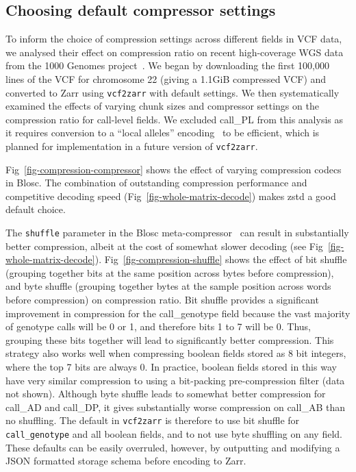 \documentclass[a4paper,num-refs]{oup-contemporary}
\begin{document}
\subsection{Choosing default compressor settings}
To inform the choice of compression settings across different fields 
in VCF data, we analysed their effect on compression ratio on 
recent high-coverage WGS data from the 1000 Genomes 
project~\citep{byrska2022high}. We began by downloading 
the first 100,000 lines of the VCF 
for chromosome 22 (giving a 1.1GiB compressed VCF)
and converted to Zarr using 
\texttt{vcf2zarr} with default settings. We then systematically 
examined the effects of varying chunk sizes and compressor settings
on the compression ratio for call-level fields. We excluded call\_PL
from this analysis as it requires conversion to a ``local alleles''
encoding~\citep{poterba2024scalable} to be efficient, 
which is planned for implementation in a future 
version of \texttt{vcf2zarr}.

Fig~\ref{fig-compression-compressor} shows the effect of varying compression
codecs in Blosc. The combination of outstanding compression performance
and competitive decoding speed (Fig~\ref{fig-whole-matrix-decode}) 
makes zstd a good default choice.

The \texttt{shuffle} parameter in the Blosc meta-compressor~\cite{alted2010modern}
can result in substantially better compression, albeit at the 
cost of somewhat slower decoding (see Fig~\ref{fig-whole-matrix-decode}).
Fig~\ref{fig-compression-shuffle} shows the effect of 
bit shuffle (grouping together bits at the same position
across bytes before compression), and byte shuffle (grouping together 
bytes at the sample position across words before compression)
on compression ratio. Bit shuffle provides a significant
improvement in compression for the call\_genotype field  because 
the vast majority of genotype calls will be 0 or 1, and therefore 
bits 1 to 7 will be 0. Thus, grouping these bits together will 
lead to significantly better compression. This strategy also 
works well when compressing boolean fields stored as 
8 bit integers, where the top 7 bits are always 0. In practice,
boolean fields stored in this way have very similar compression
to using a bit-packing pre-compression filter (data not shown).
Although byte shuffle leads to somewhat better compression for call\_AD
and call\_DP, it gives substantially worse compression on call\_AB
than no shuffling. 
The default in \texttt{vcf2zarr}
is therefore to use bit shuffle for \texttt{call\_genotype}
and all boolean fields, and to not use 
byte shuffling on any field. These defaults can be easily
overruled, however, by outputting and modifying a JSON formatted 
storage schema before encoding to Zarr.
\end{document}
